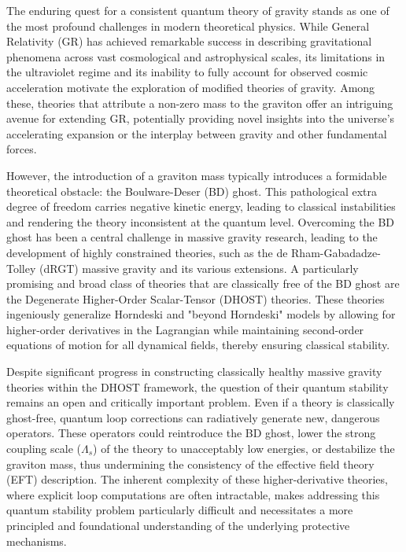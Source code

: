 \documentclass[twocolumn]{aastex631}
\begin{document}
The enduring quest for a consistent quantum theory of gravity stands as one of the most profound challenges in modern theoretical physics. While General Relativity (GR) has achieved remarkable success in describing gravitational phenomena across vast cosmological and astrophysical scales, its limitations in the ultraviolet regime and its inability to fully account for observed cosmic acceleration motivate the exploration of modified theories of gravity. Among these, theories that attribute a non-zero mass to the graviton offer an intriguing avenue for extending GR, potentially providing novel insights into the universe's accelerating expansion or the interplay between gravity and other fundamental forces.

However, the introduction of a graviton mass typically introduces a formidable theoretical obstacle: the Boulware-Deser (BD) ghost. This pathological extra degree of freedom carries negative kinetic energy, leading to classical instabilities and rendering the theory inconsistent at the quantum level. Overcoming the BD ghost has been a central challenge in massive gravity research, leading to the development of highly constrained theories, such as the de Rham-Gabadadze-Tolley (dRGT) massive gravity and its various extensions. A particularly promising and broad class of theories that are classically free of the BD ghost are the Degenerate Higher-Order Scalar-Tensor (DHOST) theories. These theories ingeniously generalize Horndeski and "beyond Horndeski" models by allowing for higher-order derivatives in the Lagrangian while maintaining second-order equations of motion for all dynamical fields, thereby ensuring classical stability.

Despite significant progress in constructing classically healthy massive gravity theories within the DHOST framework, the question of their quantum stability remains an open and critically important problem. Even if a theory is classically ghost-free, quantum loop corrections can radiatively generate new, dangerous operators. These operators could reintroduce the BD ghost, lower the strong coupling scale ($\Lambda_s$) of the theory to unacceptably low energies, or destabilize the graviton mass, thus undermining the consistency of the effective field theory (EFT) description. The inherent complexity of these higher-derivative theories, where explicit loop computations are often intractable, makes addressing this quantum stability problem particularly difficult and necessitates a more principled and foundational understanding of the underlying protective mechanisms.
\end{document}

